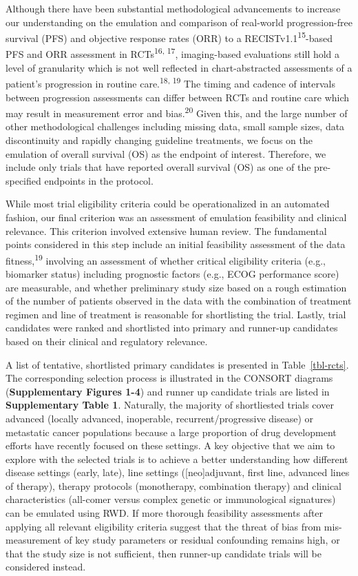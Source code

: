 \documentclass[
  letterpaper,
  DIV=11,
  numbers=noendperiod]{scrartcl}
\begin{document}
Although there have been substantial methodological advancements to
increase our understanding on the emulation and comparison of real-world
progression-free survival (PFS) and objective response rates (ORR) to a
RECISTv1.1\textsuperscript{15}-based PFS and ORR assessment in
RCTs\textsuperscript{16, 17}, imaging-based evaluations still hold a
level of granularity which is not well reflected in chart-abstracted
assessments of a patient's progression in routine
care.\textsuperscript{18, 19} The timing and cadence of intervals
between progression assessments can differ between RCTs and routine care
which may result in measurement error and bias.\textsuperscript{20}
Given this, and the large number of other methodological challenges
including missing data, small sample sizes, data discontinuity and
rapidly changing guideline treatments, we focus on the emulation of
overall survival (OS) as the endpoint of interest. Therefore, we include
only trials that have reported overall survival (OS) as one of the
pre-specified endpoints in the protocol.

While most trial eligibility criteria could be operationalized in an
automated fashion, our final criterion was an assessment of emulation
feasibility and clinical relevance. This criterion involved extensive
human review. The fundamental points considered in this step include an
initial feasibility assessment of the data fitness,\textsuperscript{19}
involving an assessment of whether critical eligibility criteria (e.g.,
biomarker status) including prognostic factors (e.g., ECOG performance
score) are measurable, and whether preliminary study size based on a
rough estimation of the number of patients observed in the data with the
combination of treatment regimen and line of treatment is reasonable for
shortlisting the trial. Lastly, trial candidates were ranked and
shortlisted into primary and runner-up candidates based on their
clinical and regulatory relevance.

A list of tentative, shortlisted primary candidates is presented in
Table~\ref{tbl-rcts}. The corresponding selection process is illustrated
in the CONSORT diagrams (\textbf{Supplementary Figures 1-4}) and runner
up candidate trials are listed in \textbf{Supplementary Table 1}.
Naturally, the majority of shortliested trials cover advanced (locally
advanced, inoperable, recurrent/progressive disease) or metastatic
cancer populations because a large proportion of drug development
efforts have recently focused on these settings. A key objective that we
aim to explore with the selected trials is to achieve a better
understanding how different disease settings (early, late), line
settings ({[}neo{]}adjuvant, first line, advanced lines of therapy),
therapy protocols (monotherapy, combination therapy) and clinical
characteristics (all-comer versus complex genetic or immunological
signatures) can be emulated using RWD. If more thorough feasibility
assessments after applying all relevant eligibility criteria suggest
that the threat of bias from mis-measurement of key study parameters or
residual confounding remains high, or that the study size is not
sufficient, then runner-up candidate trials will be considered instead.
\end{document}
